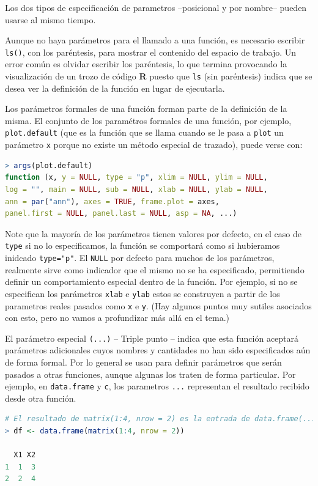 \documentclass[spanish]{extbook}
\numberwithin{equation}{section}
\numberwithin{figure}{section}
\begin{document}
Los dos tipos de especificación de parametros --posicional y por nombre-- pueden
usarse al mismo tiempo. 

Aunque no haya parámetros para el llamado a una función, es necesario escribir
\texttt{ls()}, con los paréntesis, para mostrar el contenido del espacio de
trabajo. Un error común es olvidar escribir los paréntesis, lo que termina
provocando la visualización de un trozo de código \textbf{R} puesto que
\texttt{ls} (sin paréntesis) indica que se desea ver la definición de la
función en lugar de ejecutarla.

Los parámetros formales de una función forman parte de la definición de la
misma. El conjunto de los paramétros formales de una función, por ejemplo,
\texttt{plot.default} (que es la función que se llama cuando se le pasa a
\texttt{plot} un parámetro \texttt{x} porque no existe un método especial de
trazado), puede verse con:
\newpage

\begin{lstlisting}[language=R]
> args(plot.default)
function (x, y = NULL, type = "p", xlim = NULL, ylim = NULL,
log = "", main = NULL, sub = NULL, xlab = NULL, ylab = NULL,
ann = par("ann"), axes = TRUE, frame.plot = axes,
panel.first = NULL, panel.last = NULL, asp = NA, ...)
\end{lstlisting}

Note que la mayoría de los parámetros tienen valores por defecto, en el caso de
\texttt{type} si no lo especificamos, la función se comportará como si
hubieramos inidcado \texttt{type="p"}. El \texttt{NULL} por defecto para muchos
de los parámetros, realmente sirve como indicador que el mismo no se ha
especificado, permitiendo definir un comportamiento especial dentro de la
función. Por ejemplo, si no se especifican los parámetros \texttt{xlab} e
\texttt{ylab} estos se construyen a partir de los parametros reales pasados
como \texttt{x} e \texttt{y}. (Hay algunos puntos muy sutiles asociados con
esto, pero no vamos a profundizar más allá en el tema.)

El parámetro especial \texttt{(...)} -- Triple punto -- indica que esta función
aceptará parámetros adicionales cuyos nombres y cantidades no han sido
especificados aún de forma formal. Por lo general se usan para definir
parámetros que serán pasados a otras funciones, aunque algunas los traten de
forma particular.  Por ejemplo, en \texttt{data.frame} y \texttt{c}, los
parametros \texttt{...} representan el resultado recibido desde otra función.

\begin{lstlisting}[language=R]
# El resultado de matrix(1:4, nrow = 2) es la entrada de data.frame(...)
> df <- data.frame(matrix(1:4, nrow = 2)) 

  X1 X2
1  1  3
2  2  4
\end{lstlisting}
\end{document}
